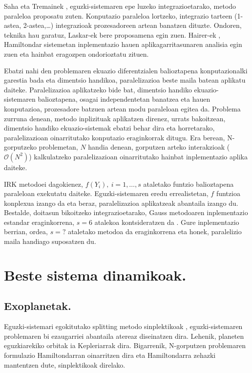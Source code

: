 Saha eta Tremainek \cite{Saha1996}, eguzki-sistemaren epe luzeko integrazioetarako, metodo paraleloa proposatu zuten. Konputazio paraleloa lortzeko, integrazio tarteen (1-astea, 2-astea,\dots) integrazioak prozesadoreen artean banatzen dituzte. Ondoren, teknika hau garatuz, Laskar-ek \cite{Jimenez-Perez2011} bere proposamena egin zuen. Hairer-ek \cite{Gander2014}, Hamiltondar sistemetan inplementazio hauen  aplikagarritasunaren analisia egin zuen eta hainbat eragozpen ondorioztatu zituen.

Ebatzi nahi den problemaren ekuazio diferentzialen balioztapena konputazionalki garestia bada eta dimentsio handikoa, paralelizazioa beste maila batean aplikatu daiteke. Paralelizazioa aplikatzeko bide bat, dimentsio handiko ekuazio-sistemaren balioztapena, osagai independentetan banatzea eta hauen konputazioa, prozesadore batzuen artean modu paraleloan egitea da. Problema zurruna denean, metodo inplizituak aplikatzen direnez, urrats bakoitzean, dimentsio handiko ekuazio-sistemak ebatzi behar dira eta horretarako, paralelizazioan oinarritutako konputazio eraginkorrak ditugu. Era berean, N-gorputzeko problemetan, $N$ handia denean, gorputzen arteko interakzioak ($\mathcal{O}(N^2)$) kalkulatzeko         
paralelizazioan oinarritutako hainbat inplementazio \cite{Barnes1986,Carrier1988,Driscoll2013} aplika daiteke. 

IRK metodoei dagokienez, $f(Y_i), \ i=1,\dots,s$ ataletako funtzio balioztapena paraleloan exekutatu daiteke. Eguzki-sistemaren eredu errealistetan, $f$ funtzioa konplexua izango da eta beraz, paralelizazioa aplikatzeak abantaila izango du. Bestalde, doitasun bikoitzeko integrazioetarako, Gauss metodoaren inplementazio estandar eraginkorrena, $s=6$ atalekoa kontsideratzen da \cite{Hairer2006}. Gure inplementazio berrian, ordea, $s=?$ ataletako metodoa da eraginkorrena eta honek, paralelizio maila handiago suposatzen du.
      

\section{Beste sistema dinamikoak.}


\subsection*{Exoplanetak.}

Eguzki-sistemari egokitutako splitting metodo sinplektikoak \cite{Wisdom1991,Laskar2001}, eguzki-sistemaren problemaren bi ezaugarriei abantaila atereaz diseinatzen dira. Lehenik, planeten eguzkiarekiko orbitak ia Kepleriarrak dira. Bigarrenik, N-gorputzen problemaren formulazio Hamiltondarran oinarritzen dira eta Hamiltondarra zehazki mantentzen dute, sinplektikoak direlako. 

